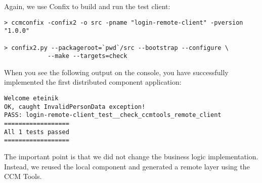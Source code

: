 Again, we use Confix to build and run the test client:
\begin{footnotesize}
\begin{verbatim}
> ccmconfix -confix2 -o src -pname "login-remote-client" -pversion "1.0.0"

> confix2.py --packageroot=`pwd`/src --bootstrap --configure \
            --make --targets=check
\end{verbatim}
\end{footnotesize}

When you see the following output on the console, you have successfully
implemented the first distributed component application:
\begin{footnotesize}
\begin{verbatim}
Welcome eteinik
OK, caught InvalidPersonData exception!
PASS: login-remote-client_test__check_ccmtools_remote_client
==================
All 1 tests passed
==================
\end{verbatim}
\end{footnotesize}

The important point is that we did not change the business logic implementation.
Instead, we reused the local component and generated a remote layer using the
CCM Tools.

\newpage